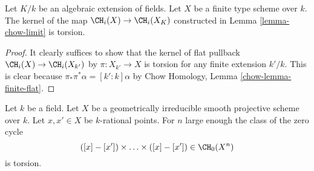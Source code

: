 \begin{lemma}
\label{lemma-kernel-to-closure}
Let $K/k$ be an algebraic extension of fields.
Let $X$ be a finite type scheme over $k$.
The kernel of the map $\CH_i(X) \to \CH_i(X_K)$
constructed in Lemma \ref{lemma-chow-limit}
is torsion.
\end{lemma}

\begin{proof}
It clearly suffices to show that the kernel
of flat pullback $\CH_i(X) \to \CH_i(X_{k'})$
by $\pi : X_{k'} \to X$ is torsion
for any finite extension $k'/k$. This is clear because
$\pi_* \pi^* \alpha = [k' : k] \alpha$ by
Chow Homology, Lemma \ref{chow-lemma-finite-flat}.
\end{proof}

\begin{lemma}[Voevodsky]
\label{lemma-smash-nilpotence}
\begin{reference}
\cite{nilpotence}
\end{reference}
Let $k$ be a field. Let $X$ be a geometrically irreducible
smooth projective scheme over $k$. Let $x, x' \in X$ be $k$-rational points.
For $n$ large enough the class of the zero cycle
$$
([x] - [x']) \times \ldots \times ([x] - [x']) \in
\CH_0(X^n)
$$
is torsion.
\end{lemma}

